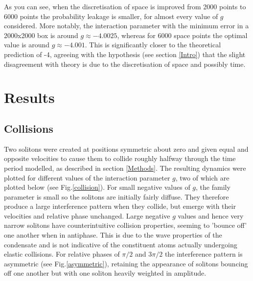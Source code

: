 \documentclass[10pt, twocolumn]{revtex4}    %
\begin{document}
As you can see, when the discretisation of space is improved from 2000 points to 6000 points the probability leakage is smaller, for almost every value of $g$ considered. More notably, the interaction parameter with the minimum error in a 2000x2000 box is around $g \approx -4.0025$, whereas for 6000 space points the optimal value is around $g \approx -4.001$. This is significantly closer to the theoretical prediction of -4, agreeing with the hypothesis (see section \ref{Intro}) that the slight disagreement with theory is due to the discretisation of space and possibly time. 



\section{Results} \label{Results}

\subsection{Collisions}

Two solitons were created at positions symmetric about zero and given equal and opposite velocities to cause them to collide roughly halfway through the time period modelled, as described in section \ref{Methods}. The resulting dynamics were plotted for different values of the interaction parameter $g$, two of which are plotted below (see Fig.\ref{collision}). For small negative values of $g$, the family parameter is small so the solitons are initially fairly diffuse. They therefore produce a large interference pattern when they collide, but emerge with their velocities and relative phase unchanged. Large negative $g$ values and hence very narrow solitons have counterintuitive collision properties, seeming to 'bounce off' one another when in antiphase. This is due to the wave properties of the condensate and is not indicative of the constituent atoms actually undergoing elastic collisions. For relative phases of $\pi/2$ and $3\pi/2$ the interference pattern is asymmetric (see Fig.\ref{asymmetric}), retaining the appearance of solitons bouncing off one another but with one soliton heavily weighted in amplitude. 
\end{document}
